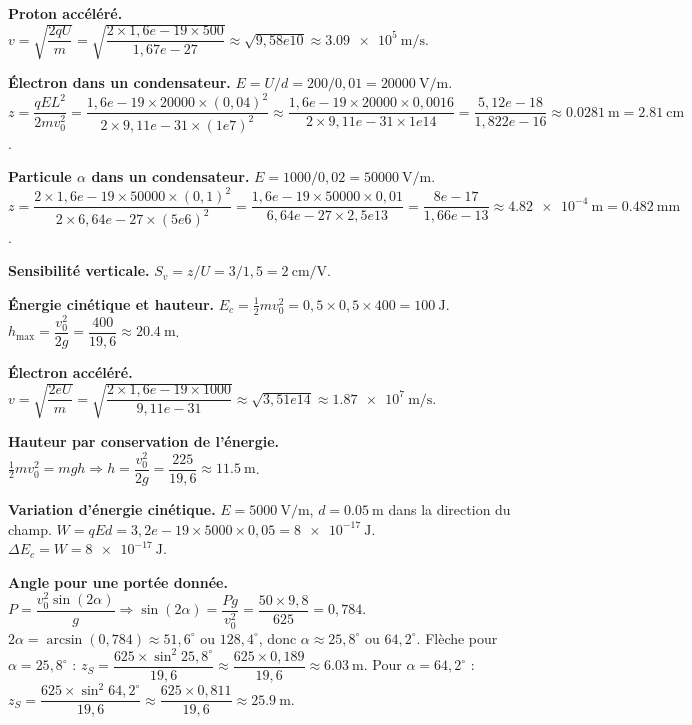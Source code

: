 \textbf{Proton accéléré.}
$v = \sqrt{\dfrac{2qU}{m}} = \sqrt{\dfrac{2\times1,6e-19\times500}{1,67e-27}} \approx \sqrt{9,58e10} \approx \SI{3,09e5}{\metre\per\second}$.

\textbf{Électron dans un condensateur.}
$E = U/d = 200/0,01 = \SI{20000}{\volt\per\metre}$.
$z = \dfrac{qE L^2}{2m v_0^2} = \dfrac{1,6e-19\times20000\times(0,04)^2}{2\times9,11e-31\times(1e7)^2} \approx \dfrac{1,6e-19\times20000\times0,0016}{2\times9,11e-31\times1e14} = \dfrac{5,12e-18}{1,822e-16} \approx \SI{0,0281}{\metre} = \SI{2,81}{\centi\metre}$.

\textbf{Particule $\alpha$ dans un condensateur.}
$E = 1000/0,02 = \SI{50000}{\volt\per\metre}$.
$z = \dfrac{2\times1,6e-19\times50000\times(0,1)^2}{2\times6,64e-27\times(5e6)^2} = \dfrac{1,6e-19\times50000\times0,01}{6,64e-27\times2,5e13} = \dfrac{8e-17}{1,66e-13} \approx \SI{4,82e-4}{\metre} = \SI{0,482}{\milli\metre}$.

\textbf{Sensibilité verticale.}
$S_v = z/U = 3/1,5 = \SI{2}{\centi\metre\per\volt}$.

\textbf{Énergie cinétique et hauteur.}
$E_c = \frac12 m v_0^2 = 0,5\times0,5\times400 = \SI{100}{\joule}$.
$h_{\max} = \dfrac{v_0^2}{2g} = \dfrac{400}{19,6} \approx \SI{20,4}{\metre}$.

\textbf{Électron accéléré.}
$v = \sqrt{\dfrac{2eU}{m}} = \sqrt{\dfrac{2\times1,6e-19\times1000}{9,11e-31}} \approx \sqrt{3,51e14} \approx \SI{1,87e7}{\metre\per\second}$.

\textbf{Hauteur par conservation de l’énergie.}
$\frac12 m v_0^2 = mgh \Rightarrow h = \dfrac{v_0^2}{2g} = \dfrac{225}{19,6} \approx \SI{11,5}{\metre}$.

\textbf{Variation d’énergie cinétique.}
$E = \SI{5000}{\volt\per\metre}$, $d = \SI{0,05}{\metre}$ dans la direction du champ.
$W = qEd = 3,2e-19\times5000\times0,05 = \SI{8e-17}{\joule}$.
$\Delta E_c = W = \SI{8e-17}{\joule}$.

\textbf{Angle pour une portée donnée.}
$P = \dfrac{v_0^2\sin(2\alpha)}{g} \Rightarrow \sin(2\alpha) = \dfrac{Pg}{v_0^2} = \dfrac{50\times9,8}{625} = 0,784$.
$2\alpha = \arcsin(0,784) \approx 51,6^\circ$ ou $128,4^\circ$, donc $\alpha \approx 25,8^\circ$ ou $64,2^\circ$.
Flèche pour $\alpha=25,8^\circ$ : $z_S = \dfrac{625\times\sin^2 25,8^\circ}{19,6} \approx \dfrac{625\times0,189}{19,6} \approx \SI{6,03}{\metre}$.
Pour $\alpha=64,2^\circ$ : $z_S = \dfrac{625\times\sin^2 64,2^\circ}{19,6} \approx \dfrac{625\times0,811}{19,6} \approx \SI{25,9}{\metre}$.

